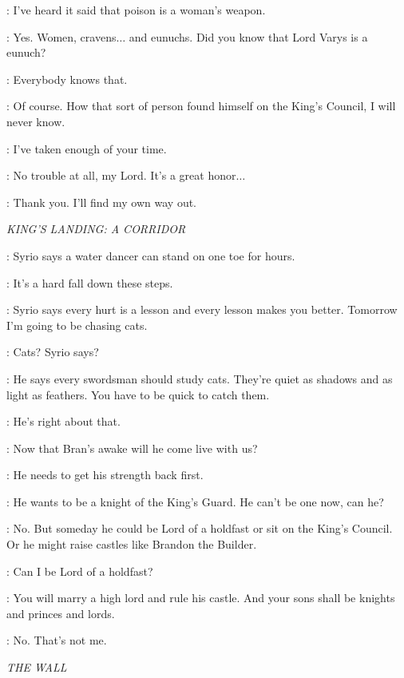 \NED: I've heard it said that poison is a woman's weapon. 

\PYCELLE: Yes. Women, cravens$\ldots$ and eunuchs. Did you know that Lord Varys is a eunuch? 

\NED: Everybody knows that. 

\PYCELLE: Of course. How that sort of person found himself on the King's Council, I will never know. 

\NED: I've taken enough of your time. 

\PYCELLE: No trouble at all, my Lord. It's a great honor$\ldots$ 

\NED: Thank you. I'll find my own way out. 

\scene

\textit{KING'S LANDING: A CORRIDOR}


\ARYA: Syrio says a water dancer can stand on one toe for hours. 

\NED: It's a hard fall down these steps. 

\ARYA: Syrio says every hurt is a lesson and every lesson makes you better. Tomorrow I'm going to be chasing cats. 

\NED: Cats? Syrio says? 

\ARYA: He says every swordsman should study cats. They're quiet as shadows and as light as feathers. You have to be quick to catch them. 

\NED: He's right about that. 

\ARYA: Now that Bran's awake will he come live with us? 

\NED: He needs to get his strength back first. 

\ARYA: He wants to be a knight of the King's Guard. He can't be one now, can he? 

\NED: No. But someday he could be Lord of a holdfast or sit on the King's Council. Or he might raise castles like Brandon the Builder. 

\ARYA: Can I be Lord of a holdfast? 

\NED: You will marry a high lord and rule his castle. And your sons shall be knights and princes and lords. 
\enlargethispage*{20pt}

\ARYA: No. That's not me. 

\scene

\textit{THE WALL}


